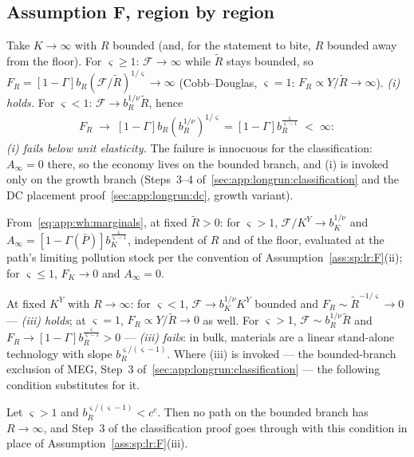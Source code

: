 \subsection{Assumption F, region by region}\label{sec:app:workhorse:F}

 Take $K\to\infty$ with $R$ bounded (and, for the
statement to bite, $R$ bounded away from the floor). For $\varsigma\ge1$:
$\mathcal F\to\infty$ while $\tilde R$ stays bounded,
so $F_R=\left[1-\Gamma\right]b_R\left(\mathcal F/\tilde R\right)^{1/\varsigma}\to\infty$
(Cobb--Douglas, $\varsigma=1$: $F_R\propto Y/\tilde R\to\infty$). \emph{(i) holds.} For
$\varsigma<1$: $\mathcal F\to b_R^{1/\nu}\tilde R$, hence
\begin{align}
F_R\;\to\;\left[1-\Gamma\right]b_R\left(b_R^{1/\nu}\right)^{1/\varsigma}
=\left[1-\Gamma\right]b_R^{\frac{\varsigma}{\varsigma-1}}\;<\;\infty:
\label{eq:app:wh:FRlimit}
\end{align}
\emph{(i) fails below unit elasticity.} The failure is innocuous for the classification:
$A_\infty=0$ there, so the economy lives on the bounded branch, and (i) is invoked only on the
growth branch (Steps~3--4 of~\ref{sec:app:longrun:classification} and the DC placement
proof~\ref{sec:app:longrun:dc}, growth variant).

 From~\eqref{eq:app:wh:marginals}, at fixed $\tilde R>0$:
for $\varsigma>1$, $\mathcal F/K^Y\to b_K^{1/\nu}$ and
$A_\infty=\left[1-\Gamma\!\left(\bar P\right)\right]b_K^{\frac{\varsigma}{\varsigma-1}}$,
independent of $R$ and of the floor, evaluated at the path's limiting pollution stock per the
convention of Assumption~\ref{ass:sp:lr:F}(ii); for $\varsigma\le1$, $F_K\to0$ and
$A_\infty=0$.

 At fixed $K^Y$ with $R\to\infty$: for $\varsigma<1$,
$\mathcal F\to b_K^{1/\nu}K^Y$ bounded and $F_R\sim\tilde R^{-1/\varsigma}\to0$ ---
\emph{(iii) holds}; at $\varsigma=1$, $F_R\propto Y/\tilde R\to0$ as well. For $\varsigma>1$,
$\mathcal F\sim b_R^{1/\nu}\tilde R$ and $F_R\to\left[1-\Gamma\right]b_R^{\frac{\varsigma}{\varsigma-1}}>0$
--- \emph{(iii) fails}: in bulk, materials are a linear stand-alone technology with slope
$b_R^{\varsigma/\left(\varsigma-1\right)}$. Where (iii) is invoked --- the bounded-branch
exclusion of MEG, Step~3 of~\ref{sec:app:longrun:classification} --- the following condition
substitutes for it.

\begin{lemma}\label{lem:app:wh:bulk}
Let $\varsigma>1$ and $b_R^{\varsigma/\left(\varsigma-1\right)}<c^c$. Then no path on the
bounded branch has $R\to\infty$, and Step~3 of the classification proof goes through with this
condition in place of Assumption~\ref{ass:sp:lr:F}(iii).
\end{lemma}

